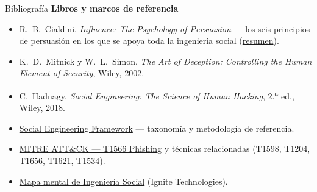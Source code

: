 \documentclass[aspectratio=169,11pt]{beamer}
\newcommand{\lead}[1]{{\color{uznavy}\bfseries #1}\par\smallskip}
\begin{document}
\begin{frame}{Bibliografía}
\small
\lead{Libros y marcos de referencia}
  \begin{itemize}\setlength{\itemsep}{0.35em}
  \item R.~B.~Cialdini, \emph{Influence: The Psychology of Persuasion} --- los seis principios de persuasión en los que se apoya toda la ingeniería social (\href{https://www.influenceatwork.com/principles-of-persuasion/}{resumen}).
  \item K.~D.~Mitnick y W.~L.~Simon, \emph{The Art of Deception: Controlling the Human Element of Security}, Wiley, 2002.
  \item C.~Hadnagy, \emph{Social Engineering: The Science of Human Hacking}, 2.\textsuperscript{a} ed., Wiley, 2018.
  \item \href{https://www.social-engineer.org/framework/general-discussion/}{Social Engineering Framework} --- taxonomía y metodología de referencia.
  \item \href{https://attack.mitre.org/techniques/T1566/}{MITRE ATT\&CK --- T1566 Phishing} y técnicas relacionadas (T1598, T1204, T1656, T1621, T1534).
  \item \href{https://github.com/Ignitetechnologies/Mindmap/tree/main/Social\%20Engineering}{Mapa mental de Ingeniería Social} (Ignite Technologies).
  \end{itemize}
\end{frame}
\end{document}
